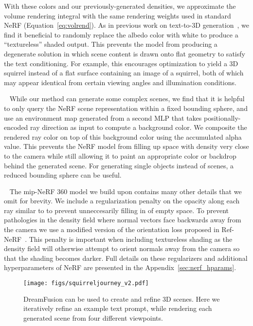 \documentclass{article} \usepackage{iclr2023_conference,times}
\newcommand{\myparagraph}[1]{\noindent {\bf #1}\,\,\,}
\newcommand{\dreamfusion}{DreamFusion\xspace}
\begin{document}
With these colors and our previously-generated densities, we approximate the volume rendering integral with the same rendering weights  used in standard NeRF (Equation~\ref{eq:volrend}).
As in previous work on text-to-3D generation~\citep{hong2022avatarclip,text2mesh}, we find it beneficial to randomly replace the albedo color  with white  to produce a ``textureless'' shaded output.
This prevents the model from producing a degenerate solution in which scene content is drawn onto flat geometry to satisfy the text conditioning. For example, this encourages optimization to yield a 3D squirrel instead of a flat surface containing an image of a squirrel, both of which may appear identical from certain viewing angles and illumination conditions. 




\myparagraph{Scene Structure.} While our method can generate some complex scenes, we find that it is helpful to only query the NeRF scene representation within a fixed bounding sphere, and use an environment map generated from a second MLP that takes positionally-encoded ray direction as input to compute a background color. We composite the rendered ray color on top of this background color using the accumulated alpha value.
This prevents the NeRF model from filling up space with density very close to the camera while still allowing it to paint an appropriate color or backdrop behind the generated scene. For generating single objects instead of scenes, a reduced bounding sphere can be useful.



\myparagraph{Geometry regularizers.}
The mip-NeRF 360 model we build upon contains many other details that we omit for brevity. We include a regularization penalty on the opacity along each ray similar to \citet{jain2021dreamfields} to prevent unneccesarily filling in of empty space. To prevent pathologies in the density field where normal vectors face backwards away from the camera we use a modified version of the orientation loss proposed in Ref-NeRF~\citep{verbin2022refnerf}. This penalty is important when including textureless shading as the density field will otherwise attempt to orient normals away from the camera so that the shading becomes darker. Full details on these regularizers and additional hyperparameters of NeRF are presented in the Appendix~\ref{sec:nerf_hparams}.




\begin{figure}[t]
\texttt{[image: figs/squirreljourney\_v2.pdf]}
\caption{\dreamfusion can be used to create and refine 3D scenes. Here we iteratively refine an example text prompt, while rendering each generated scene from four different viewpoints.}
\label{fig:journey}
\vspace{-5mm}
\end{figure}
\end{document}
